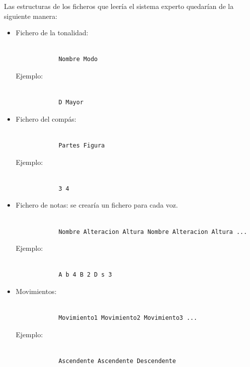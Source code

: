 Las estructuras de los ficheros que leería el sistema experto quedarían de la siguiente manera:

\begin{itemize}

	\item Fichero de la tonalidad:

		\begin{lstlisting}[frame=single]

			Nombre Modo

		\end{lstlisting}

		Ejemplo:

		\begin{lstlisting}[frame=single]

			D Mayor

		\end{lstlisting} 

	\bigskip
	\item Fichero del compás:

		\begin{lstlisting}[frame=single]

			Partes Figura

		\end{lstlisting}

		Ejemplo:

		\begin{lstlisting}[frame=single]

			3 4

		\end{lstlisting} 

	\bigskip
	\item Fichero de notas: se crearía un fichero para cada voz.
	
		\begin{lstlisting}[frame=single]

			Nombre Alteracion Altura Nombre Alteracion Altura ...

		\end{lstlisting} 

		Ejemplo:

		\begin{lstlisting}[frame=single]

			A b 4 B 2 D s 3

		\end{lstlisting} 

	\bigskip
	\item Movimientos:

		\begin{lstlisting}[frame=single]

			Movimiento1 Movimiento2 Movimiento3 ...

		\end{lstlisting} 

		Ejemplo:

		\begin{lstlisting}[frame=single]

			Ascendente Ascendente Descendente

		\end{lstlisting} 

\end{itemize}

